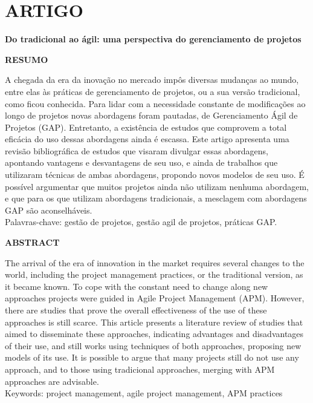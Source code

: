 \anexo
\chapter{ARTIGO}

\begin{center}
{\large \textbf{Do tradicional ao ágil: uma perspectiva do gerenciamento de projetos}}
\end{center}

\begin{center}
\textbf{RESUMO}
\end{center}

\singlespacing
\noindent A chegada da era da inovação no mercado impôs diversas mudanças ao mundo, entre elas às práticas de gerenciamento de projetos, ou a sua versão tradicional, como ficou conhecida. Para lidar com a necessidade constante de modificações ao longo de projetos novas abordagens foram pautadas, de Gerenciamento Ágil de Projetos (GAP). Entretanto, a existência de estudos que comprovem a total eficácia do uso dessas abordagens ainda é escassa. Este artigo apresenta uma revisão bibliográfica de estudos que visaram divulgar essas abordagens, apontando vantagens e desvantagens de seu uso, e ainda de trabalhos que utilizaram técnicas de ambas abordagens, propondo novos modelos de seu uso. É possível argumentar que muitos projetos ainda não utilizam nenhuma abordagem, e que para os que utilizam abordagens tradicionais, a mesclagem com abordagens GAP são aconselháveis. \\
\noindent Palavras-chave: gestão de projetos, gestão agil de projetos, práticas GAP.


\begin{center}
\textbf{ABSTRACT}
\end{center}

\singlespacing
\noindent The arrival of the era of innovation in the market requires several changes to the world, including the project management practices, or the traditional version, as it became known. To cope with the constant need to change along new approaches projects were guided in Agile Project Management (APM). However, there are studies that prove the overall effectiveness of the use of these approaches is still scarce. This article presents a literature review of studies that aimed to disseminate these approaches, indicating advantages and disadvantages of their use, and still works using techniques of both approaches, proposing new models of its use. It is possible to argue that many projects still do not use any approach, and to those using tradicional approaches, merging with APM approaches are advisable. \\
\noindent Keywords: project management, agile project management, APM practices


